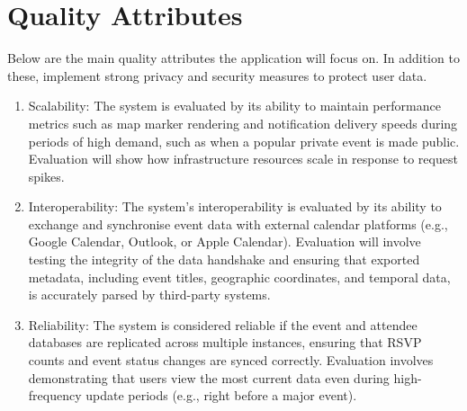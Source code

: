 \section*{Quality Attributes}
Below are the main quality attributes the application will focus on. 
In addition to these, implement strong privacy and security measures to protect user data.
\begin{enumerate}
\item Scalability: The system is evaluated by its ability to maintain performance metrics such as map marker rendering and notification delivery speeds during periods of high demand, such as when a popular private event is made public. Evaluation will show how infrastructure resources scale in response to request spikes.
\item Interoperability: The system’s interoperability is evaluated by its ability to exchange and synchronise event data with external calendar platforms (e.g., Google Calendar, Outlook, or Apple Calendar). Evaluation will involve testing the integrity of the data handshake and ensuring that exported metadata, including event titles, geographic coordinates, and temporal data, is accurately parsed by third-party systems.
\item Reliability: The system is considered reliable if the event and attendee databases are replicated across multiple instances, ensuring that RSVP counts and event status changes are synced correctly. Evaluation involves demonstrating that users view the most current data even during high-frequency update periods (e.g., right before a major event).
\end{enumerate}

